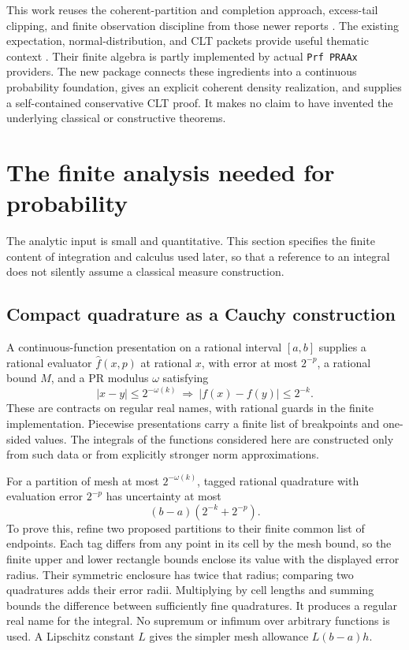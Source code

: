 This work reuses the coherent-partition and completion approach, excess-tail
clipping, and finite observation discipline from those newer reports
\cite{repoObservable,repoMeasureTransport}. The existing expectation,
normal-distribution, and CLT packets provide useful thematic context
\cite{repoProbability}. Their finite algebra is partly implemented by actual
\texttt{Prf PRAAx} providers. The new package connects these ingredients into
a continuous probability foundation, gives an explicit coherent density
realization, and supplies a self-contained conservative CLT proof. It makes
no claim to have invented the underlying classical or constructive theorems.

\section{The finite analysis needed for probability}
\label{sec:finite-analysis}

The analytic input is small and quantitative. This section specifies the
finite content of integration and calculus used later, so that a reference
to an integral does not silently assume a classical measure construction.

\subsection{Compact quadrature as a Cauchy construction}

A continuous-function presentation on a rational interval $[a,b]$ supplies
a rational evaluator $\widehat f(x,p)$ at rational $x$, with error at most
$2^{-p}$, a rational bound $M$, and a PR modulus $\omega$ satisfying
\[
 |x-y|\le2^{-\omega(k)}\ \Longrightarrow\ |f(x)-f(y)|\le2^{-k}.
\]
These are contracts on regular real names, with rational guards in the
finite implementation. Piecewise presentations carry a finite list of
breakpoints and one-sided values. The integrals of the functions considered
here are constructed only from such data or from explicitly stronger norm
approximations.

For a partition of mesh at most $2^{-\omega(k)}$, tagged rational quadrature
with evaluation error $2^{-p}$ has uncertainty at most
\[
 (b-a)(2^{-k}+2^{-p}).
\]
To prove this, refine two proposed partitions to their finite common list of
endpoints. Each tag differs from any point in its cell by the mesh bound, so
the finite upper and lower rectangle bounds enclose its value with the
displayed error radius. Their symmetric enclosure has twice that radius;
comparing two quadratures adds their error radii. Multiplying by cell lengths
and summing bounds the difference between sufficiently fine quadratures. It produces a
regular real name for the integral. No supremum or infimum over arbitrary
functions is used. A Lipschitz constant $L$ gives the simpler mesh allowance
$L(b-a)h$.


